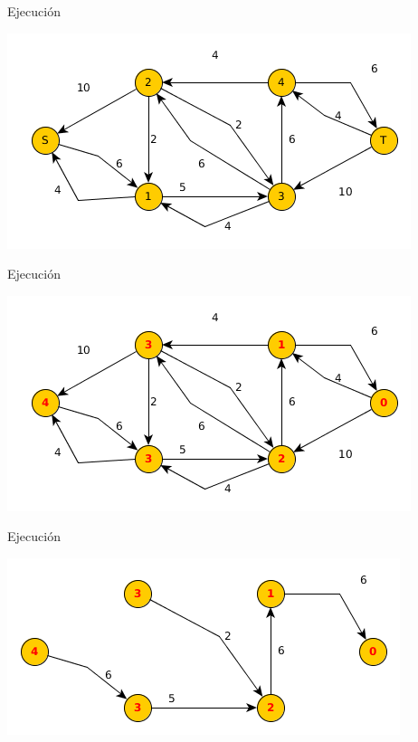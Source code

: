 \documentclass{beamer}
\begin{document}
\begin{frame}{Ejecución}

    
    \includegraphics[scale=0.6]{dinitz/dinitz18.png}
    
\end{frame}

\begin{frame}{Ejecución}

    
    \includegraphics[scale=0.6]{dinitz/dinitz19.png}
    
\end{frame}

\begin{frame}{Ejecución}

    
    \includegraphics[scale=0.6]{dinitz/dinitz20.png}
    
\end{frame}
\end{document}

